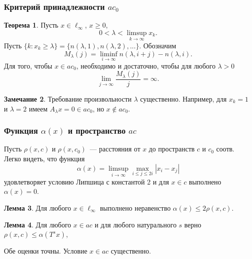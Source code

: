 \documentclass[10pt,pdf,hyperref={unicode}]{beamer}
\theoremstyle{definition}
\newtheorem{llemma}{Лемма}
\newtheorem{ttheorem}[llemma]{Теорема}
\newtheorem{remark}[llemma]{Замечание}
\begin{document}
\begin{frame}
	\frametitle{Критерий принадлежности $ac_0$~\cite{our-mz2019ac0}}



	\begin{ttheorem}
		Пусть $x\in\ell_\infty$, $x \geq 0$,
		\begin{equation*}
			0<\lambda < \limsup_{k\to\infty} x_k
			.
		\end{equation*}
		Пусть $\{k: x_k \geq \lambda \} = \{n(\lambda,1),n(\lambda,2),...\}$.
		Обозначим
		\begin{equation*}
			M_{\lambda}(j) = \liminf_{i\to\infty} n(\lambda,i+j) - n(\lambda,i)
			.
		\end{equation*}
		Для того, чтобы $x\in ac_0$, необходимо и достаточно, чтобы
		для любого $\lambda>0$
		\begin{equation*}
			\lim_{j \to \infty} \frac{M_{\lambda}(j)}{j} = \infty
			.
		\end{equation*}
	\end{ttheorem}


	\begin{remark}
		Требование произвольности $\lambda$ существенно.
		Например, для $x_k = 1$ и $\lambda = 2$ имеем $A_\lambda x = 0 \in ac_0$,
		но $x\notin ac_0$.
	\end{remark}


\end{frame}


\begin{frame}
	\frametitle{Функция $\alpha(x)$ и пространство $ac$~\cite{our-mz2019ac0}}
	Пусть $\rho(x,c)$ и $\rho(x,c_0)$~--- расстояния от $x$ до пространств $c$
	и $c_0$ соотв.
	Легко видеть, что функция
	\begin{equation*}
		\alpha(x) = \limsup_{i\to\infty} \max_{i \leq j \leq 2i} |x_i-x_j|
	\end{equation*}
	удовлетворяет условию Липшица с константой 2
	и для $x\in c$ выполнено
	$\alpha(x)=0$.

	\begin{llemma}
	\label{thm:alpha_x_leq_2_rho_x_c}
		Для любого $x\in\ell_\infty$
		выполнено неравенство
		$
			\alpha(x) \leq 2\rho(x, c)
		$.
	\end{llemma}


	\begin{llemma}
	\label{thm:rho_x_c_leq_alpha_t_s_x}
		Для любого $x\in ac$ и для любого натурального $s$ верно
		$
			\rho(x,c)\leq \alpha(T^s x)
		$,
	\end{llemma}

	Обе оценки точны.
	Условие $x\in ac$ существенно.

\end{frame}
\end{document}
